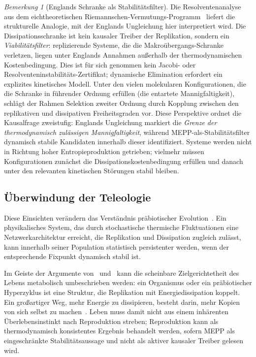 \documentclass[12pt,a4paper]{article}
\theoremstyle{remark}
\newtheorem{remark}{Bemerkung}
\begin{document}
\begin{remark}[Englands Schranke als Stabilitätsfilter]
\label{rem:england-stability-filter}
Die Resolventenanalyse aus dem eichtheoretischen Riemannschen-Vermutungs-Programm~\citep{GeigerRH2026b} liefert die strukturelle Analogie, mit der Englands Ungleichung hier interpretiert wird. Die Dissipationsschranke ist kein kausaler Treiber der Replikation, sondern ein \emph{Viabilitätsfilter}: replizierende Systeme, die die Makroübergangs-Schranke verletzen, liegen unter Englands Annahmen außerhalb der thermodynamischen Kostenbedingung. Dies ist für sich genommen kein Jacobi- oder Resolventeninstabilitäts-Zertifikat; dynamische Elimination erfordert ein explizites kinetisches Modell. Unter den vielen molekularen Konfigurationen, die die Schranke in führender Ordnung erfüllen (die entartete Mannigfaltigkeit), schlägt der Rahmen Selektion zweiter Ordnung durch Kopplung zwischen den replikativen und dissipativen Freiheitsgraden vor. Diese Perspektive ordnet die Kausalfrage zweistufig: Englands Ungleichung markiert die \emph{Grenze der thermodynamisch zulässigen Mannigfaltigkeit}, während MEPP-als-Stabilitätsfilter dynamisch stabile Kandidaten innerhalb dieser identifiziert. Systeme werden nicht in Richtung hoher Entropieproduktion getrieben; vielmehr müssen Konfigurationen zunächst die Dissipationskostenbedingung erfüllen und danach unter den relevanten kinetischen Störungen stabil bleiben.
\end{remark}

\subsection{Überwindung der Teleologie}

Diese Einsichten verändern das Verständnis präbiotischer Evolution~\citep{UnbecomingBeing}. Ein physikalisches System, das durch stochastische thermische Fluktuationen eine Netzwerkarchitektur erreicht, die Replikation und Dissipation zugleich zulässt, kann innerhalb seiner Population statistisch persistenter werden, wenn der entsprechende Fixpunkt dynamisch stabil ist.

Im Geiste der Argumente von~\citet{UnbecomingBeing} und~\citet{England2013} kann die scheinbare Zielgerichtetheit des Lebens metabolisch umbeschrieben werden: ein Organismus oder ein präbiotischer Hyperzyklus ist eine Struktur, die Replikation mit Energiedissipation koppelt. \glqq Ein großartiger Weg, mehr Energie zu dissipieren, besteht darin, mehr Kopien von sich selbst zu machen\grqq{}~\citep{England2013}. Leben muss damit nicht aus einem inhärenten Überlebensinstinkt nach Reproduktion streben; Reproduktion kann als thermodynamisch konsistentes Ergebnis behandelt werden, sofern MEPP als eingeschränkte Stabilitätsaussage und nicht als aktiver kausaler Treiber gelesen wird.
\end{document}
